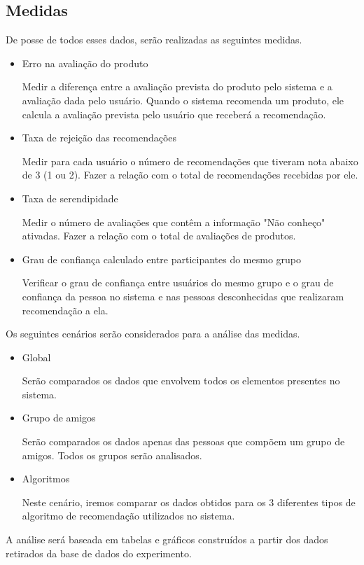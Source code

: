 \subsection{Medidas}

De posse de todos esses dados, serão realizadas as seguintes medidas.

\begin{itemize}

\item Erro na avaliação do produto

 Medir a diferença entre a avaliação prevista do produto pelo sistema e a avaliação dada pelo usuário. Quando o sistema recomenda um produto, ele calcula a avaliação prevista pelo usuário que receberá a recomendação.

\item Taxa de rejeição das recomendações
		
 Medir para cada usuário o número de recomendações que tiveram nota abaixo de 3 (1 ou 2). Fazer a relação com o total de recomendações recebidas por ele.

\item Taxa de serendipidade

 Medir o número de avaliações que contêm a informação "Não conheço" ativadas. Fazer a relação com o total de avaliações de produtos.

\item Grau de confiança calculado entre participantes do mesmo grupo

 Verificar o grau de confiança entre usuários do mesmo grupo e o grau de confiança da pessoa no sistema e nas pessoas desconhecidas que realizaram recomendação a ela.
\end{itemize}

 Os seguintes cenários serão considerados para a análise das medidas.

\begin{itemize}

\item Global

 Serão comparados os dados que envolvem todos os elementos presentes no sistema.

\item Grupo de amigos

 Serão comparados os dados apenas das pessoas que compõem um grupo de amigos. Todos os grupos serão analisados.

\item Algoritmos

 Neste cenário, iremos comparar os dados obtidos para os 3 diferentes tipos de algoritmo de recomendação utilizados no sistema.

\end{itemize}

 A análise será baseada em tabelas e gráficos construídos a partir dos dados retirados da base de dados do experimento.